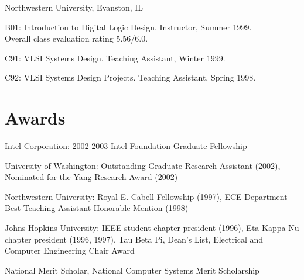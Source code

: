 \documentclass[line]{res}
\newenvironment{list1}{
  \begin{list}{\ding{113}}{%
      \setlength{\itemsep}{0in}
      \setlength{\parsep}{0in} \setlength{\parskip}{0in}
      \setlength{\topsep}{0in} \setlength{\partopsep}{0in} 
      \setlength{\leftmargin}{0.17in}}}{\end{list}}
\begin{document}
\begin{resume}
	Northwestern University, Evanston, IL\\
	\vspace{-.1in} 
	\begin{list1}
		\item[] B01: Introduction to Digital Logic Design. Instructor, Summer 1999.\\
		Overall class evaluation rating 5.56/6.0. 
		\item[] C91: VLSI Systems Design. Teaching Assistant, Winter 1999. 
		\item[] C92: VLSI Systems Design Projects. Teaching Assistant, Spring 1998. 
	\end{list1}
	
	\section{\sc Awards} 
	
	Intel Corporation: 2002-2003 Intel Foundation Graduate Fellowship
	
	University of Washington: Outstanding Graduate Research Assistant (2002), Nominated for the Yang Research Award (2002)
	
	Northwestern University: Royal E. Cabell Fellowship (1997), ECE Department Best Teaching Assistant Honorable Mention (1998)
	
	Johns Hopkins University: IEEE student chapter president (1996), Eta Kappa Nu chapter president (1996, 1997), Tau Beta Pi, Dean's List, Electrical and Computer Engineering Chair Award
	
	National Merit Scholar, National Computer Systems Merit Scholarship
	
\end{resume}
\end{document}
